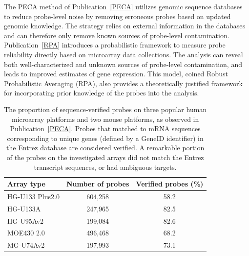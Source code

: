 The PECA method of Publication~\ref{PECA} utilizes genomic sequence
databases to reduce probe-level noise by removing erroneous probes
based on updated genomic knowledge. The strategy relies on external
information in the databases and can therefore only remove known
sources of probe-level contamination.  Publication~\ref{RPA}
introduces a probabilistic framework to measure probe reliability
directly based on microarray data collections. The analysis can reveal
both well-characterized and unknown sources of probe-level
contamination, and leads to improved estimates of gene expression.
This model, coined Robust Probabilistic Averaging (RPA), also provides
a theoretically justified framework for incorporating prior knowledge
of the probes into the analysis.


\begin{center}
\begin{table}[htb]
\label{tab:verified}
\begin{tabular}{lcc}
Array type  	&Number of probes  	&Verified probes (\%)\\\hline
HG-U133 Plus2.0 &604,258 	&58.2\\
HG-U133A 	&247,965 	&82.5\\	
HG-U95Av2 	&199,084 	&82.6\\	
MOE430 2.0 	&496,468 	&68.2\\	
MG-U74Av2 	&197,993 	&73.1 	
\end{tabular}
\caption{The proportion of sequence-verified probes on three popular human
  microarray platforms and two mouse platforms, as observed in
  Publication~\ref{PECA}. Probes that matched to mRNA sequences corresponding to unique genes (defined by a GeneID identifier) in the Entrez database are considered verified. A remarkable portion of the probes on the investigated arrays did not match the Entrez transcript sequences, or had ambiguous targets.}
\end{table}
\end{center}


